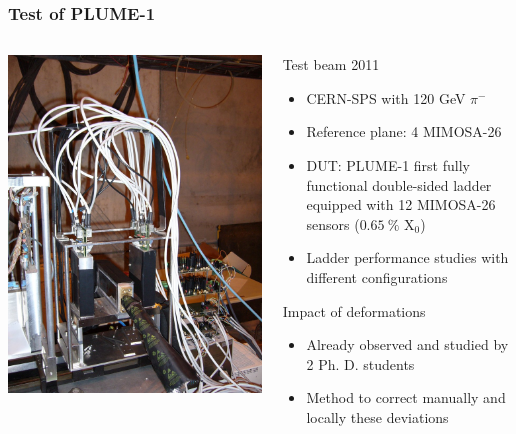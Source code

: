 \documentclass{beamer}
\begin{document}
  \begin{frame}
    \frametitle{Test of PLUME-1}

    \vspace{-0.7cm}
    \begin{columns}[t]
      \begin{column}{4cm}
        \begin{center}
          \includegraphics[width = 4 cm]{Pictures/plume_testBeam_nov2011.jpg}
        \end{center}
      \end{column}

      \begin{column}{7cm}
        \begin{block}{Test beam 2011}
          \footnotesize{
          \begin{itemize}
            \item CERN-SPS with 120 GeV $\pi^{-}$
            \item Reference plane: 4 MIMOSA-26
            \item DUT: PLUME-1 first fully functional double-sided ladder equipped with 12 MIMOSA-26 sensors ($0.65~\%$ X$_0$)
            \item Ladder performance studies with different configurations
          \end{itemize}
          }
        \end{block}

        \vspace{-0.3cm}
        \begin{block}{Impact of deformations}
          \footnotesize{
          \begin{itemize}
            \item Already observed and studied by 2 Ph. D. students
            \item Method to correct manually and locally these deviations
          \end{itemize}
          }
        \end{block}
      \end{column}
    \end{columns}
          

  \end{frame}
\end{document}
